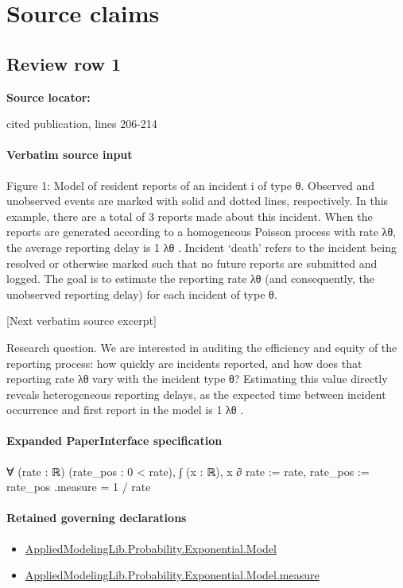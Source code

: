 \documentclass[10pt]{article}
\begin{document}
\section*{Source claims}
\subsection*{Review row 1}
\textbf{Source locator:} {\footnotesize\raggedright cited publication, lines 206-\allowbreak{}214\par}
\paragraph{Verbatim source input}
\begin{ReviewVerbatim}
Figure 1: Model of resident reports of an incident i of type θ. Observed and unobserved events
are marked with solid and dotted lines, respectively. In this example, there are a total of 3 reports
made about this incident. When the reports are generated according to a homogeneous Poisson
process with rate λθ, the average reporting delay is
1
λθ . Incident ‘death’ refers to the incident being
resolved or otherwise marked such that no future reports are submitted and logged. The goal is to
estimate the reporting rate λθ (and consequently, the unobserved reporting delay) for each incident
of type θ.

[Next verbatim source excerpt]

Research question.
We are interested in auditing the efficiency and equity of the reporting
process: how quickly are incidents reported, and how does that reporting rate λθ vary with the
incident type θ?
Estimating this value directly reveals heterogeneous reporting delays, as the
expected time between incident occurrence and first report in the model is
1
λθ .
\end{ReviewVerbatim}



\paragraph{Expanded PaperInterface specification}
\begin{ReviewVerbatim}
∀ (rate : ℝ) (rate_pos : 0 < rate), ∫ (x : ℝ), x ∂{ rate := rate, rate_pos := rate_pos }.measure = 1 / rate
\end{ReviewVerbatim}

\paragraph{Retained governing declarations}
\begin{itemize}\raggedright
\item \hyperlink{governing-declaration-82b7914cdb2aa374}{Applied\allowbreak{}Modeling\allowbreak{}Lib.\allowbreak{}Probability.\allowbreak{}Exponential.\allowbreak{}Model}
\item \hyperlink{governing-declaration-204558c62e63ea8d}{Applied\allowbreak{}Modeling\allowbreak{}Lib.\allowbreak{}Probability.\allowbreak{}Exponential.\allowbreak{}Model.\allowbreak{}measure}
\end{itemize}
\end{document}
